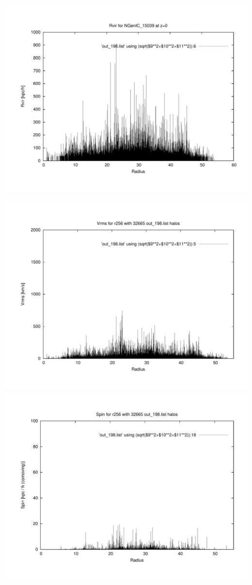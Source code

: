 \includegraphics[scale=0.3]{r256/NGenIC_15039/plot_rvir_z0.pdf}

\includegraphics[scale=0.3]{r256/NGenIC_15039/plot_Vrms_out_198.pdf}
\includegraphics[scale=0.3]{r256/NGenIC_15039/plot_spin_out_198.pdf}
% 
%
%
%
%
%
%
%


